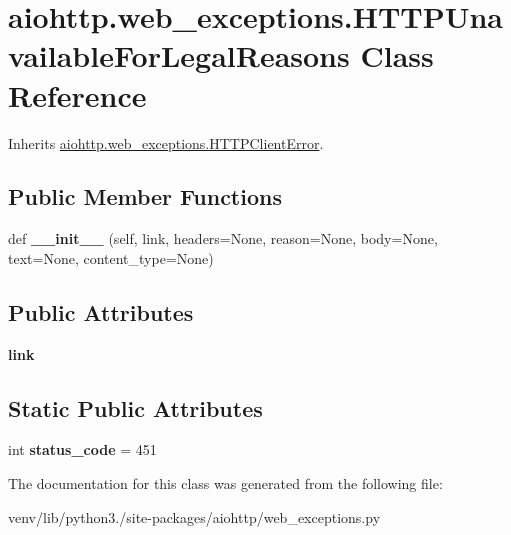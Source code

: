 \hypertarget{classaiohttp_1_1web__exceptions_1_1_h_t_t_p_unavailable_for_legal_reasons}{}\section{aiohttp.\+web\+\_\+exceptions.\+H\+T\+T\+P\+Unavailable\+For\+Legal\+Reasons Class Reference}
\label{classaiohttp_1_1web__exceptions_1_1_h_t_t_p_unavailable_for_legal_reasons}


Inherits \hyperlink{classaiohttp_1_1web__exceptions_1_1_h_t_t_p_client_error}{aiohttp.\+web\+\_\+exceptions.\+H\+T\+T\+P\+Client\+Error}.

\subsection*{Public Member Functions}
\begin{DoxyCompactItemize}
\item 
\mbox{\label{classaiohttp_1_1web__exceptions_1_1_h_t_t_p_unavailable_for_legal_reasons_a542500431426b6df6bbac8b2dfefff34}} 
def {\bfseries \+\_\+\+\_\+init\+\_\+\+\_\+} (self, link, headers=None, reason=None, body=None, text=None, content\+\_\+type=None)
\end{DoxyCompactItemize}
\subsection*{Public Attributes}
\begin{DoxyCompactItemize}
\item 
\mbox{\label{classaiohttp_1_1web__exceptions_1_1_h_t_t_p_unavailable_for_legal_reasons_aa6b7bc138106ff98971b4eeb7d42a6ad}} 
{\bfseries link}
\end{DoxyCompactItemize}
\subsection*{Static Public Attributes}
\begin{DoxyCompactItemize}
\item 
\mbox{\label{classaiohttp_1_1web__exceptions_1_1_h_t_t_p_unavailable_for_legal_reasons_aec42c468c2fbc6a443ea2c5b002dcb23}} 
int {\bfseries status\+\_\+code} = 451
\end{DoxyCompactItemize}


The documentation for this class was generated from the following file\+:\begin{DoxyCompactItemize}
\item 
venv/lib/python3./site-\/packages/aiohttp/web\+\_\+exceptions.\+py\end{DoxyCompactItemize}
